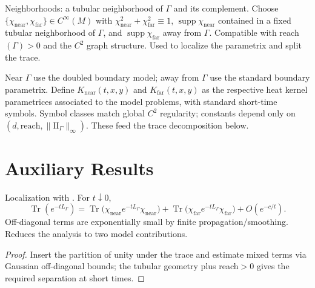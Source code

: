 \begin{definition}\label{def:fa-pou}
\Orientation Neighborhoods: a tubular neighborhood of $\Gamma$ and its complement.
\Statement Choose $\{\chi_{\mathrm{near}},\chi_{\mathrm{far}}\}\in C^\infty(M)$ with
$\chi_{\mathrm{near}}^2+\chi_{\mathrm{far}}^2\equiv 1$, $\operatorname{supp}\chi_{\mathrm{near}}$
contained in a fixed tubular neighborhood of $\Gamma$, and $\operatorname{supp}\chi_{\mathrm{far}}$
away from $\Gamma$. 
\Audit Compatible with reach$(\Gamma)>0$ and the $C^2$ graph structure.
\Closure Used to localize the parametrix and split the trace.
\end{definition}

\begin{definition}\label{def:blocks}
\Orientation Near $\Gamma$ use the doubled boundary model; away from $\Gamma$ use the standard boundary parametrix.
\Statement Define $K_{\mathrm{near}}(t,x,y)$ and $K_{\mathrm{far}}(t,x,y)$ as the respective heat kernel parametrices associated to the model problems, with standard short-time symbols.
\Audit Symbol classes match global $C^2$ regularity; constants depend only on $(d,\mathrm{reach},\|\mathrm{II}_\Gamma\|_\infty)$.
\Closure These feed the trace decomposition below.
\end{definition}

\section{Auxiliary Results}

\begin{lemma}\label{lem:trace-split}
\Orientation Localization with .
\Statement For $t\downarrow 0$,
\[
\operatorname{Tr}(e^{-tL_\Gamma})
=\operatorname{Tr}\big(\chi_{\mathrm{near}} e^{-tL_\Gamma}\chi_{\mathrm{near}}\big)
+\operatorname{Tr}\big(\chi_{\mathrm{far}} e^{-tL_\Gamma}\chi_{\mathrm{far}}\big)
+O(e^{-c/t}).
\]
\Audit Off-diagonal terms are exponentially small by finite propagation/smoothing.
\Closure Reduces the analysis to two model contributions.
\end{lemma}

\begin{proof}
Insert the partition of unity under the trace and estimate mixed terms via
Gaussian off-diagonal bounds; the tubular geometry plus reach$>0$ gives the
required separation at short times.
\end{proof}

